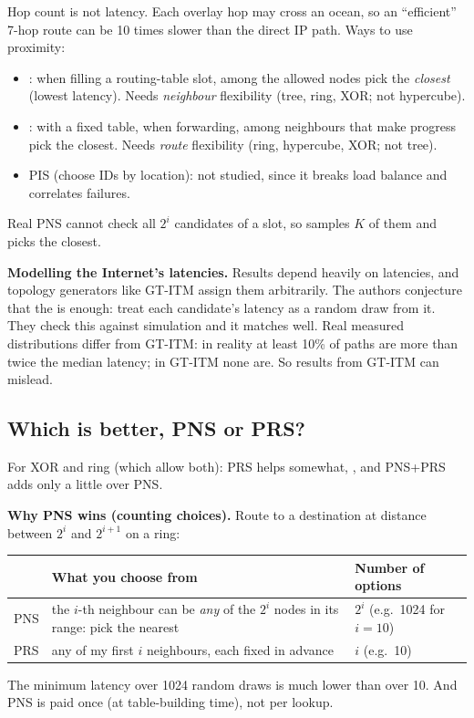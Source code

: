 Hop count is not latency. Each overlay hop may cross an ocean, so an ``efficient'' 7-hop route can be 10 times slower than the direct IP path. Ways to
use proximity:
\begin{itemize}
  \item {}: when filling a routing-table slot, among the allowed nodes pick the \emph{closest} (lowest latency). Needs
        \emph{neighbour} flexibility (tree, ring, XOR; not hypercube).
  \item {}: with a fixed table, when forwarding, among neighbours that make progress pick the closest. Needs \emph{route}
        flexibility (ring, hypercube, XOR; not tree).
  \item PIS (choose IDs by location): not studied, since it breaks load balance and correlates failures.
\end{itemize}
Real PNS cannot check all $2^i$ candidates of a slot, so  samples $K$ of them and picks the closest.

\textbf{Modelling the Internet's latencies.} Results depend heavily on latencies, and topology generators like GT-ITM assign them arbitrarily. The authors conjecture
that the  is enough: treat each candidate's latency as a random draw from it. They check this against simulation and
it matches well. Real measured distributions differ from GT-ITM: in reality at least 10\% of paths are more than twice the median latency; in GT-ITM none are. So results
from GT-ITM can mislead.

\subsection{Which is better, PNS or PRS?}
For XOR and ring (which allow both): PRS helps somewhat, , and PNS+PRS adds only a little over PNS.

\textbf{Why PNS wins (counting choices).} Route to a destination at distance between $2^i$ and $2^{i+1}$ on a ring:
\begin{center}
\small
\begin{tabular}{@{}lll@{}}
\toprule
 & What you choose from & Number of options\\
\midrule
PNS & the $i$-th neighbour can be \emph{any} of the $2^i$ nodes in its range: pick the nearest & $2^i$ (e.g.\ 1024 for $i = 10$)\\
PRS & any of my first $i$ neighbours, each fixed in advance & $i$ (e.g.\ 10)\\
\bottomrule
\end{tabular}
\end{center}
The minimum latency over 1024 random draws is much lower than over 10. And PNS is paid once (at table-building time), not per lookup.

